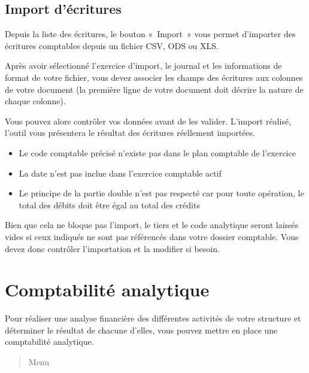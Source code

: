 \documentclass[a4paper,10pt,oneside,french]{sphinxmanual}
\begin{document}
\subsection{Import d’écritures}
\label{\detokenize{accounting/entity:import-d-ecritures}}
\sphinxAtStartPar
Depuis la liste des écritures, le bouton « Import » vous permet d’importer des écritures comptables depuis un fichier CSV, ODS ou XLS.

\sphinxAtStartPar
Après avoir sélectionné l’exercice d’import, le journal et les informations de format de votre fichier, vous devez associer les champs des écritures aux colonnes de votre document (la première ligne de votre document doit décrire la nature de chaque colonne).
\begin{quote}

\noindent{}
\end{quote}

\sphinxAtStartPar
Vous pouvez alors contrôler vos données avant de les valider.
L’import réalisé, l’outil vous présentera le résultat des écritures réellement importées.

\sphinxAtStartPar
{}
\begin{itemize}
\item {} 
\sphinxAtStartPar
Le code comptable précisé n’existe pas dans le plan comptable de l’exercice

\item {} 
\sphinxAtStartPar
La date n’est pas inclue dans l’exercice comptable actif

\item {} 
\sphinxAtStartPar
Le principe de la partie double n’est pas respecté car pour toute opération, le total des débits doit être égal au total des crédits

\end{itemize}

\sphinxAtStartPar
Bien que cela ne bloque pas l’import, le tiers et le code analytique seront laissés vides si ceux indiqués ne sont pas référencés dans votre dossier comptable. Vous devez donc contrôler l’importation et la modifier si besoin.

\sphinxstepscope


\section{Comptabilité analytique}
\label{\detokenize{accounting/costaccounting:comptabilite-analytique}}\label{\detokenize{accounting/costaccounting::doc}}
\sphinxAtStartPar
Pour réaliser une analyse financière des différentes activités de votre structure et déterminer le résultat de chacune d’elles, vous pouvez mettre en place une comptabilité analytique.
\begin{quote}

\sphinxAtStartPar
Menu 
\end{quote}
\end{document}
